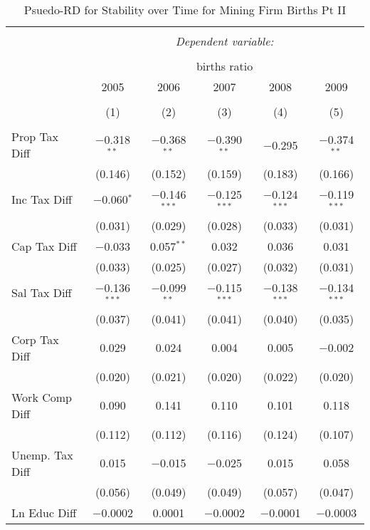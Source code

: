 
\begin{table}[!htbp] \centering 
  \caption{Psuedo-RD for Stability over Time for  Mining Firm Births Pt II} 
  \label{21year} 
\small 
\begin{tabular}{@{\extracolsep{5pt}}lccccc} 
\\[-1.8ex]\hline 
\hline \\[-1.8ex] 
 & \multicolumn{5}{c}{\textit{Dependent variable:}} \\ 
\cline{2-6} 
\\[-1.8ex] & \multicolumn{5}{c}{births ratio} \\ 
 & 2005 & 2006 & 2007 & 2008 & 2009 \\ 
\\[-1.8ex] & (1) & (2) & (3) & (4) & (5)\\ 
\hline \\[-1.8ex] 
 Prop Tax Diff & $-$0.318$^{**}$ & $-$0.368$^{**}$ & $-$0.390$^{**}$ & $-$0.295 & $-$0.374$^{**}$ \\ 
  & (0.146) & (0.152) & (0.159) & (0.183) & (0.166) \\ 
  Inc Tax Diff & $-$0.060$^{*}$ & $-$0.146$^{***}$ & $-$0.125$^{***}$ & $-$0.124$^{***}$ & $-$0.119$^{***}$ \\ 
  & (0.031) & (0.029) & (0.028) & (0.033) & (0.031) \\ 
  Cap Tax Diff & $-$0.033 & 0.057$^{**}$ & 0.032 & 0.036 & 0.031 \\ 
  & (0.033) & (0.025) & (0.027) & (0.032) & (0.031) \\ 
  Sal Tax Diff & $-$0.136$^{***}$ & $-$0.099$^{**}$ & $-$0.115$^{***}$ & $-$0.138$^{***}$ & $-$0.134$^{***}$ \\ 
  & (0.037) & (0.041) & (0.041) & (0.040) & (0.035) \\ 
  Corp Tax Diff & 0.029 & 0.024 & 0.004 & 0.005 & $-$0.002 \\ 
  & (0.020) & (0.021) & (0.020) & (0.022) & (0.020) \\ 
  Work Comp Diff & 0.090 & 0.141 & 0.110 & 0.101 & 0.118 \\ 
  & (0.112) & (0.112) & (0.116) & (0.124) & (0.107) \\ 
  Unemp. Tax Diff & 0.015 & $-$0.015 & $-$0.025 & 0.015 & 0.058 \\ 
  & (0.056) & (0.049) & (0.049) & (0.057) & (0.047) \\ 
  Ln Educ Diff & $-$0.0002 & 0.0001 & $-$0.0002 & $-$0.0001 & $-$0.0003 \\ 

\end{tabular}
\end{table}
